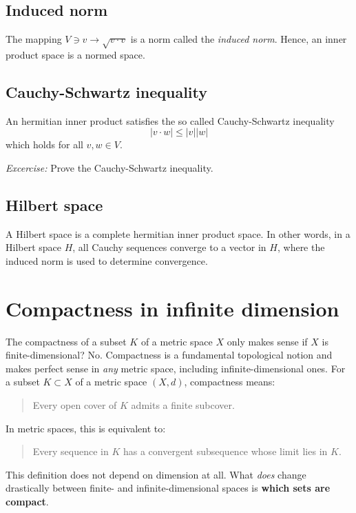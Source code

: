 \documentclass[aps,prl,twocolumn,groupedaddress]{revtex4-2}
\begin{document}
\subsection{Induced norm}

The mapping $V\ni v\to \sqrt{v\cdot v}$ is a norm called the {\em induced norm}.
Hence, an inner product space is a normed space.

\subsection{Cauchy-Schwartz inequality}

An hermitian inner product satisfies the so called Cauchy-Schwartz inequality
$$
|v\cdot w| \leq |v||w|
$$
which holds for all $v,w\in V$.

{\em Excercise:}
Prove the Cauchy-Schwartz inequality.

\subsection{Hilbert space}

A Hilbert space is a complete hermitian inner product space.
In other words, in a Hilbert space $H$, all Cauchy sequences converge to a vector in $H$, where the induced norm is used to determine convergence.

\appendix

\section{
Compactness in infinite dimension
\label{app:A}
}


The compactness of a subset $K$ of a metric space $X$ only makes sense if $X$ is finite-dimensional?
No. Compactness is a fundamental topological notion and makes perfect sense in {\em any} metric space, including infinite-dimensional ones.
For a subset $K \subset X$ of a metric space $(X,d)$, compactness means: 
\begin{quote}
Every open cover of $K$ admits a finite subcover.
\end{quote}
In metric spaces, this is equivalent to: 
\begin{quote}
Every sequence in $K$ has a convergent subsequence whose limit lies in $K$.
\end{quote}
This definition does not depend on dimension at all.
What {\em does} change drastically between finite- and infinite-dimensional spaces is {\bf which sets are compact}.
\end{document}
